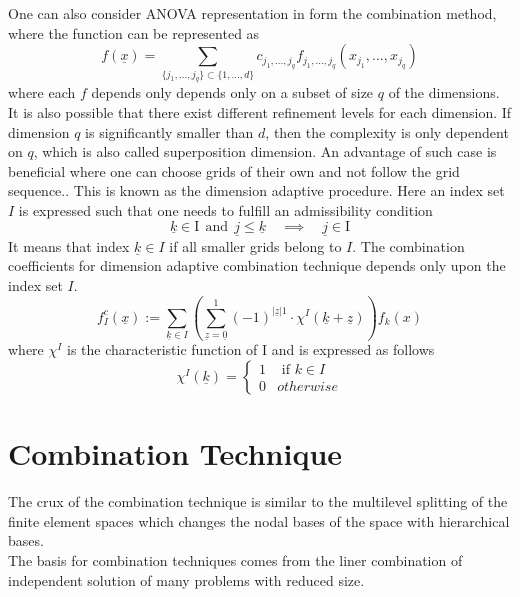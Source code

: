 One can also consider ANOVA representation in form the combination method, where the function can be represented as
\begin{equation}
	f(\underline{x}) = \sum_{\{j_1,...,j_q\}\subset\{1,...,d\}} c_{j_1,...,j_q} f_{j_1,...,j_q} \left( x_{j_1},...,x_{j_q} \right)
\end{equation}
where each $f$ depends only depends only on a subset of size $q$ of the dimensions. It is also possible that there exist different refinement levels for each dimension. If dimension $q$ is significantly smaller than $d$, then the complexity is only dependent on $q$, which is also called superposition dimension. An advantage of such case is beneficial where one can choose grids of their own and not follow the grid sequence.. This is known as the dimension adaptive procedure. Here an index set $I$ is expressed such that one needs to fulfill an admissibility condition
\begin{equation}
	\underline{k} \in \text{I} \ \ \text{and} \ \ \underline{j}\le \underline{k} \quad \implies \quad \underline{j}\in \text{I}
\end{equation}
It means that index $\underline{k} \in I$ if all smaller grids belong to $I$. The combination coefficients for dimension adaptive combination technique depends only upon the index set $I$. 
\begin{equation}
    f_I^c\left(\underline{x}\right) := \sum\limits_{\underline{k} \in I}\left( \sum\limits_{\underline{z} = \underline{0}}^{1}\left(-1\right)^{\left|\underline{z}\right|1}\cdot \chi^{I}\left(\underline{k}+\underline{z}\right)\right)f_{k}\left(x\right)
\end{equation}
where $\chi^{I}$ is the characteristic function of I and is expressed as follows
\begin{equation}
     \chi^{I}(\underline{k}) =
     \begin{cases}
        1 &  \text{ if } k \in I\\
        0 & otherwise 
     \end{cases}
\end{equation}




\section{Combination Technique}
The crux of the combination technique is similar to the multilevel splitting of the finite element spaces which changes the nodal bases of the space with hierarchical bases. \cite{Yserentant1986} \\
The basis for combination techniques comes from the liner combination of independent solution of many problems with reduced size. \cite{Griebel1992}\\

